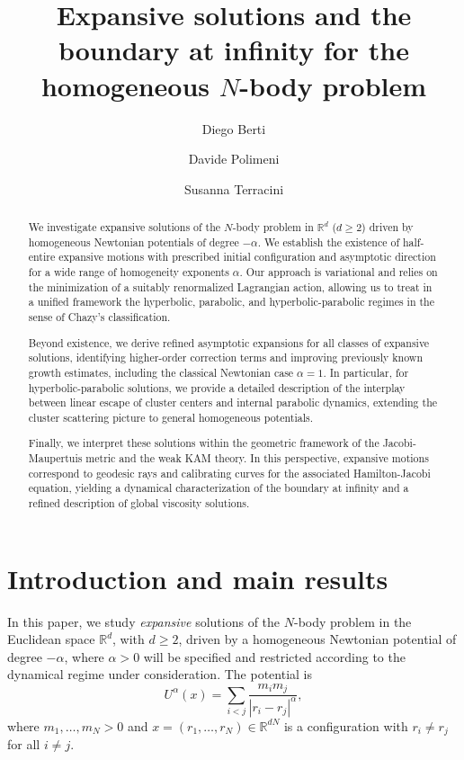 \documentclass[a4paper,10pt]{amsart}
\title[Expansive solutions]{\textbf{Expansive solutions and the boundary at infinity for the homogeneous $N$-body problem}}
\date{}
\author{Diego Berti}%
\author{Davide Polimeni}%
\author{Susanna Terracini}%
\theoremstyle{plain}
\theoremstyle{definition}
\numberwithin{equation}{section}
\numberwithin{thm}{section}
\begin{document}
\begin{abstract}
We investigate expansive solutions of the $N$-body problem in $\mathbb{R}^d$ ($d \ge 2$) driven by homogeneous Newtonian potentials of degree $-\alpha$. We establish the existence of half-entire expansive motions with prescribed initial configuration and asymptotic direction for a wide range of homogeneity exponents $\alpha$. Our approach is variational and relies on the minimization of a suitably  renormalized Lagrangian action, allowing us to treat in a unified framework the hyperbolic, parabolic, and hyperbolic-parabolic regimes in the sense of Chazy’s classification.

Beyond existence, we derive refined asymptotic expansions for all classes of expansive solutions, identifying higher-order correction terms and improving previously known growth estimates, including the classical Newtonian case $\alpha=1$. In particular, for hyperbolic-parabolic solutions,  we provide a detailed description of the interplay between linear escape of cluster centers and internal parabolic dynamics, extending the cluster scattering picture to general homogeneous potentials.

Finally, we interpret these solutions within the geometric framework of the Jacobi-Maupertuis metric and the weak KAM theory. In this perspective, expansive motions correspond to geodesic rays and calibrating curves for the associated Hamilton-Jacobi equation, yielding a dynamical characterization of the boundary at infinity and a refined description of global viscosity solutions.
\end{abstract}

\maketitle







\section{Introduction and main results}

In this paper, we study \emph{expansive} solutions of the $N$-body problem in the Euclidean space $\mathbb{R}^{d}$, with $d\ge 2$, driven by a homogeneous Newtonian potential of degree $-\alpha$, where $\alpha>0$ will be specified and restricted according to the dynamical regime under consideration. The potential is
\[
U^\alpha(x)=\sum_{i<j}\frac{m_i m_j}{|r_i-r_j|^\alpha},
\]
where $m_1,\dots,m_N>0$ and $x=(r_1,\dots,r_N)\in\mathbb{R}^{dN}$ is a configuration with $r_i\neq r_j$ for all $i\neq j$.
\end{document}
